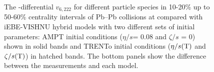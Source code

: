 \begin{figure}[!htb]
\begin{center}
\end{center}
\caption{The \pT-differential $v_{6,222}$ for different particle species in 10-20\% up to 50-60\% centrality intervals of Pb--Pb collisions at \sNN compared with iEBE-VISHNU hybrid models with two different sets of initial parameters: AMPT initial conditions ($\eta/s$= 0.08 and $\zeta/s$ = 0) shown in solid bands and TRENTo initial conditions ($\eta/s({\rm T})$ and $\zeta/s({\rm T})$) in hatched bands. The bottom panels show the difference between the measurements and each model.}
\label{v6222_model}
\end{figure}



\newpage